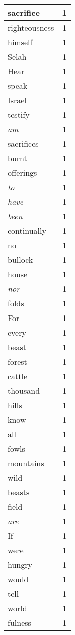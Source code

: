 \begin{center}
\begin{longtable}{l|r}
sacrifice & 1 \\ \hline
righteousness & 1 \\ \hline
himself & 1 \\ \hline
Selah & 1 \\ \hline
Hear & 1 \\ \hline
speak & 1 \\ \hline
Israel & 1 \\ \hline
testify & 1 \\ \hline
\emph{am} & 1 \\ \hline
sacrifices & 1 \\ \hline
burnt & 1 \\ \hline
offerings & 1 \\ \hline
\emph{to} & 1 \\ \hline
\emph{have} & 1 \\ \hline
\emph{been} & 1 \\ \hline
continually & 1 \\ \hline
no & 1 \\ \hline
bullock & 1 \\ \hline
house & 1 \\ \hline
\emph{nor} & 1 \\ \hline
folds & 1 \\ \hline
For & 1 \\ \hline
every & 1 \\ \hline
beast & 1 \\ \hline
forest & 1 \\ \hline
cattle & 1 \\ \hline
thousand & 1 \\ \hline
hills & 1 \\ \hline
know & 1 \\ \hline
all & 1 \\ \hline
fowls & 1 \\ \hline
mountains & 1 \\ \hline
wild & 1 \\ \hline
beasts & 1 \\ \hline
field & 1 \\ \hline
\emph{are} & 1 \\ \hline
If & 1 \\ \hline
were & 1 \\ \hline
hungry & 1 \\ \hline
would & 1 \\ \hline
tell & 1 \\ \hline
world & 1 \\ \hline
fulness & 1 \\ \hline

\end{longtable}
\end{center}
